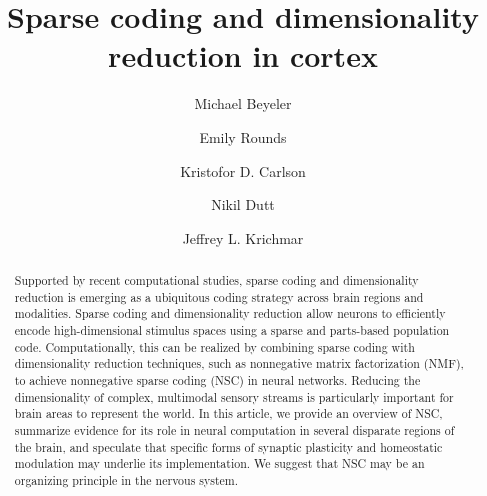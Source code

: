 \documentclass[review,12pt,sort&compress]{elsarticle}
\begin{document}
\begin{frontmatter}

\title{Sparse coding and dimensionality reduction in cortex}





\author[UCI,UW]{Michael Beyeler}
\author[UCI]{Emily Rounds}
\author[Sandia]{Kristofor D. Carlson}
\author[UCI]{Nikil Dutt}
\author[UCI]{Jeffrey L. Krichmar}
%
\address[UCI]{University of California, Irvine, Irvine, CA, USA}
\address[UW]{University of Washington, Seattle, WA, USA}
\address[Sandia]{Sandia National Laboratories, Albuquerque, NM, USA}


\begin{abstract}
Supported by recent computational studies, sparse coding and
dimensionality reduction is emerging as a ubiquitous coding strategy across brain regions and modalities. Sparse coding and dimensionality reduction allow neurons to efficiently encode high-dimensional stimulus spaces using a sparse and parts-based population code.
Computationally, this can be realized by combining sparse coding with dimensionality reduction techniques, such as nonnegative matrix factorization (NMF), to achieve nonnegative sparse coding (NSC) in neural networks. Reducing the dimensionality of complex, multimodal sensory streams is particularly important for brain areas to represent the world. In this article, we provide an overview of NSC, summarize evidence for its role in neural computation in several disparate regions of the brain, and speculate that specific forms of synaptic plasticity and homeostatic modulation may underlie its implementation. We  suggest that NSC may be an organizing principle in the nervous system.
\end{abstract}


\end{frontmatter}
\end{document}

